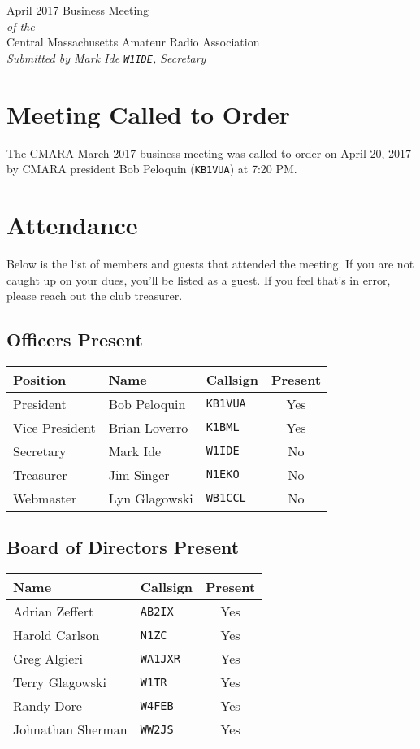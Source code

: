 \documentclass[10pt,letterpaper]{article}
\begin{document}
\begin{center}
{\huge April 2017 Business Meeting}\\
\emph{of the}\\
{\Large Central Massachusetts Amateur Radio Association}\\
\emph{Submitted by Mark Ide \texttt{W1IDE}, Secretary}
\end{center}

\section{Meeting Called to Order}
The CMARA March 2017 business meeting was called to order on April 20, 2017 by CMARA president Bob Peloquin (\texttt{KB1VUA}) at 7:20 PM.

\section{Attendance}
\noindent
Below is the list of members and guests that attended the meeting. If you are not caught up on your dues, you'll be listed as a guest. If you feel that's in error, please reach out the club treasurer.

\subsection{Officers Present}
\begin{tabular}{|l|l|l|c|}
  \hline
  \textbf{Position} & \textbf{Name}  & \textbf{Callsign} & \textbf{Present} \\ \hline
  President         & Bob Peloquin   & \texttt{KB1VUA}   & Yes \\
  Vice President    & Brian Loverro  & \texttt{K1BML}    & Yes \\
  Secretary         & Mark Ide       & \texttt{W1IDE}    & No  \\
  Treasurer         & Jim Singer     & \texttt{N1EKO}    & No  \\
  Webmaster         & Lyn Glagowski  & \texttt{WB1CCL}   & No  \\
  \hline
\end{tabular}

\subsection{Board of Directors Present}
\begin{tabular}{|l|l|c|}
  \hline
  \textbf{Name}     & \textbf{Callsign} & \textbf{Present} \\ \hline
  Adrian Zeffert    & \texttt{AB2IX}    & Yes \\
  Harold Carlson    & \texttt{N1ZC}     & Yes \\
  Greg Algieri      & \texttt{WA1JXR}   & Yes \\
  Terry Glagowski   & \texttt{W1TR}     & Yes \\
  Randy Dore        & \texttt{W4FEB}    & Yes \\
  Johnathan Sherman & \texttt{WW2JS}    & Yes \\
  \hline
\end{tabular}
\end{document}

